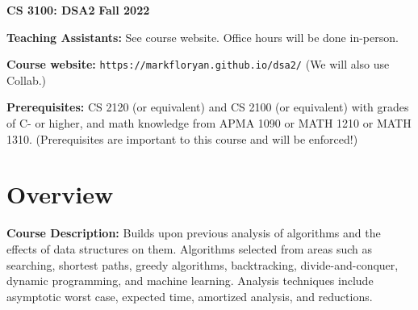 \documentclass[12pt]{article}
\begin{document}
\textbf{\Large CS 3100: DSA2} \hfill \textbf{\Large Fall 2022}

\vskip 0.5in 


\vskip 0.1in
\textbf{Teaching Assistants:} See course website.  Office hours will be done in-person.

\vskip 0.1in
\textbf{Course website:} {\tt https://markfloryan.github.io/dsa2/} (We will also use Collab.)

\textbf{Prerequisites:} CS 2120 (or equivalent) and CS 2100 (or equivalent) with grades of C- or higher, and math knowledge from APMA 1090 or MATH 1210 or MATH 1310. (Prerequisites are important to this course and will be enforced!)

\section*{Overview}

\textbf{Course Description:} Builds upon previous analysis of algorithms and the effects of data structures on them. Algorithms selected from areas such as searching, shortest paths, greedy algorithms, backtracking, divide-and-conquer, dynamic programming, and machine learning. Analysis techniques include asymptotic worst case, expected time, amortized analysis, and reductions.
\end{document}
